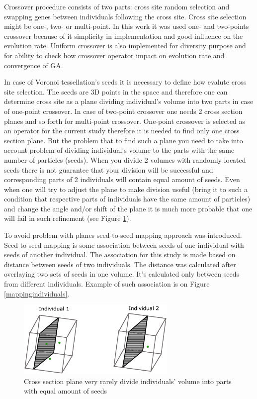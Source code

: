 \documentclass[12pt]{report}
\begin{document}
Crossover procedure consists of two parts: cross site random selection and swapping genes between individuals following the cross site. Cross site selection might be one-, two- or multi-point. In this work it was used one- and two-points crossover because of it simplicity in implementation and good influence on the evolution rate. Uniform crossover is also implemented for diversity purpose and for ability to check how crossover operator impact on evolution rate and convergence of GA.

In case of Voronoi tessellation's seeds it is necessary to define how evalute cross site selection. The seeds are 3D points in the space and therefore one can determine cross site as a plane dividing individual's volume into two parts in case of one-point crossover. In case of two-point crossover one needs 2 cross section planes and so forth for multi-point crossover. One-point crossover is selected as an operator for the current study therefore it is needed to find only one cross section plane. But the problem that to find such a plane you need to take into account problem of dividing individual's volume to the parts with the same number of particles (seeds). When you divide 2 volumes with randomly located seeds there is not guarantee that your division will be successful and corresponding parts of 2 individuals will contain equal amount of seeds. Even when one will try to adjust the plane to make division useful (bring it to such a condition that respective parts of individuals have the same amount of particles) and change the angle and/or shift of the plane it is much more probable that one will fail in such refinement (see Figure \ref{faildivision}).

To avoid problem with planes seed-to-seed mapping approach was introduced. Seed-to-seed mapping is some association between seeds of one individual with seeds of another individual. The association for this study is made based on distance between seeds of two individuals. The distance was calculated after overlaying two sets of seeds in one volume. It's calculated only between seeds from different individuals. Example of such association is on Figure \ref{mappingindividuals}.

\begin{figure}
    \centering
    \includegraphics[width=3.0in]{cubes_cross_section}
    \caption{Cross section plane very rarely divide individuals' volume into parts with equal amount of seeds}
    \label{faildivision}
\end{figure}
\end{document}
